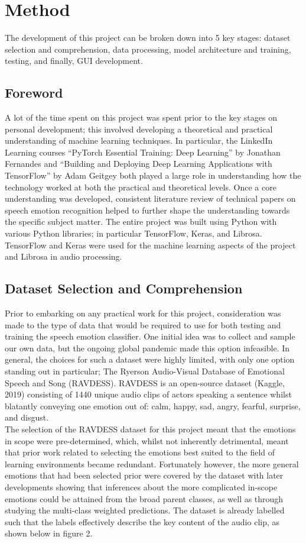 \documentclass[12pt]{article}
\begin{document}
\section{Method}
The development of this project can be broken down into 5 key stages: dataset selection and comprehension, data processing, model architecture and training, testing, and finally, GUI development.
\subsection{Foreword}
A lot of the time spent on this project was spent prior to the key stages on personal development; this involved developing a theoretical and practical understanding of machine learning techniques. In particular, the LinkedIn Learning courses ``PyTorch Essential Training: Deep Learning'' by Jonathan Fernandes and ``Building and Deploying Deep Learning Applications with TensorFlow'' by Adam Geitgey both played a large role in understanding how the technology worked at both the practical and theoretical levels. Once a core understanding was developed, consistent literature review of technical papers on speech emotion recognition helped to further shape the understanding towards the specific subject matter. The entire project was built using Python with various Python libraries; in particular TensorFlow, Keras, and Librosa. TensorFlow and Keras were used for the machine learning aspects of the project and Librosa in audio processing.
\subsection{Dataset Selection and Comprehension}
Prior to embarking on any practical work for this project, consideration was made to the type of data that would be required to use for both testing and training the speech emotion classifier. One initial idea was to collect and sample our own data, but the ongoing global pandemic made this option infeasible. In general, the choices for such a dataset were highly limited, with only one option standing out in particular; The Ryerson Audio-Visual Database of Emotional Speech and Song (RAVDESS). RAVDESS is an open-source dataset (Kaggle, 2019) consisting of 1440 unique audio clips of actors speaking a sentence whilst blatantly conveying one emotion out of: calm, happy, sad, angry, fearful, surprise, and disgust.
\\

\noindent The selection of the RAVDESS dataset for this project meant that the emotions in scope were pre-determined, which, whilst not inherently detrimental, meant that prior work related to selecting the emotions best suited to the field of learning environments became redundant. Fortunately however, the more general emotions that had been selected prior were covered by the dataset with later developments showing that inferences about the more complicated in-scope emotions could be attained from the broad parent classes, as well as through studying the multi-class weighted predictions.
\newpage
\noindent The dataset is already labelled such that the labels effectively describe the key content of the audio clip, as shown below in figure 2.
\\
\end{document}
